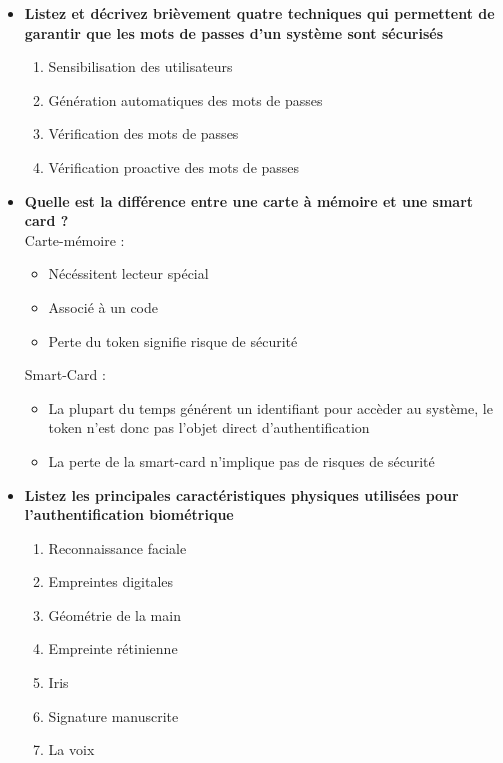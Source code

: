\documentclass{report}
\begin{document}
\begin{itemize}
				\item \textbf{Listez et décrivez brièvement quatre techniques qui permettent de garantir que les mots de passes d'un système sont sécurisés}\\

					\begin{enumerate}
						\item Sensibilisation des utilisateurs
						\item Génération automatiques des mots de passes
						\item Vérification des mots de passes
						\item Vérification proactive des mots de passes\\
					\end{enumerate}

				\item \textbf{Quelle est la différence entre une carte à mémoire et une smart card ?}\\

					Carte-mémoire : 
					\begin{itemize}
						\item Nécéssitent lecteur spécial
						\item Associé à un code
						\item Perte du token signifie risque de sécurité\\
					\end{itemize}

					Smart-Card :
					\begin{itemize}
						\item La plupart du temps générent un identifiant pour accèder au système, le token n'est donc pas l'objet direct d'authentification
						\item La perte de la smart-card n'implique pas de risques de sécurité\\
					\end{itemize}

				\item \textbf{Listez les principales caractéristiques physiques utilisées pour l'authentification biométrique}\\

					\begin{enumerate}
						\item Reconnaissance faciale
						\item Empreintes digitales
						\item Géométrie de la main
						\item Empreinte rétinienne
						\item Iris
						\item Signature manuscrite
						\item La voix\\
					\end{enumerate}

			\end{itemize}
				
\end{document}
